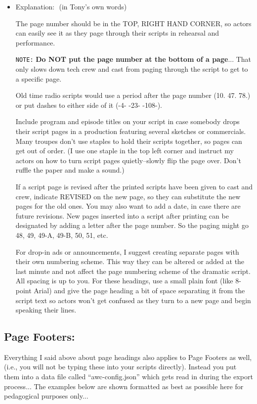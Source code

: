 \documentclass[openleft,oneside,showtrims]{memoir}
\begin{document}
\begin{itemize}
\item Explanation:  (in Tony's own words)
\label{sec:orgd37e6d6}

The page number should be in the TOP, RIGHT HAND CORNER, so actors can easily see it as they page through their scripts in rehearsal and performance.

\texttt{NOTE:} \textbf{Do NOT put the page number at the bottom of a page}... That only
      slows down tech crew and cast from paging through the script
      to get to a specific page.

Old time radio scripts would use a period after the page number (10. 47. 78.) or put dashes to either side of it (-4- -23- -108-).

Include program and episode titles on your script in case somebody drops their script pages in a production featuring several sketches or commercials. Many troupes don't use staples to hold their scripts together, so pages can get out of order. (I use one staple in the top left corner and instruct my actors on how to turn script pages quietly--slowly flip the page over. Don't ruffle the paper and make a sound.)

If a script page is revised after the printed scripts have been given to cast and crew, indicate REVISED on the new page, so they can substitute the new pages for the old ones. You may also want to add a date, in case there are future revisions. New pages inserted into a script after printing can be designated by adding a letter after the page number. So the paging might go 48, 49, 49-A, 49-B, 50, 51, etc.

For drop-in ads or announcements, I suggest creating separate pages with their own numbering scheme. This way they can be altered or added at the last minute and not affect the page numbering scheme of the dramatic script. All spacing is up to you. For these headings, use a small plain font (like 8-point Arial) and give the page heading a bit of space separating it from the script text so actors won't get confused as they turn to a new page and begin speaking their lines.
\end{itemize}

\subsection{Page Footers:}
\label{sec:orgfc2d7c3}
Everything I said above about page headings also applies to Page Footers as well, (i.e., you will not be typing these into your scripts directly).  Instead you put them into a data file called ``awc-config.json'' which gets read in during the export process... The examples below are shown formatted as best as possible here for pedagogical purposes only...
\end{document}
